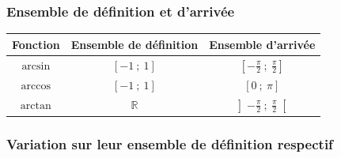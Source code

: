 \documentclass[a4paper]{article}
\begin{document}
			\vspace*{-0.25cm}

			\subsubsection*{Ensemble de définition et d'arrivée}

				\begin{center}
					\setcellgapes{1.5mm}
					\makegapedcells
					\begin{tabular}{|c|c|c|}
						\hline
						\textbf{Fonction} & \textbf{Ensemble de définition} & \textbf{Ensemble d'arrivée} \\
						\hline
						$\arcsin$ & $[-1~;~1]$ & $[-\frac{\pi}{2}~;~\frac{\pi}{2}]$ \\
						\hline
						$\arccos$ & $[-1~;~1]$ & $[0~;~\pi]$\\
						\hline
						$\arctan$ & $\mathbb{R}$ & $\left]-\frac{\pi}{2}~;~\frac{\pi}{2}\right[$\\
						\hline
					\end{tabular}
				\end{center}
			
			\vspace*{-0.25cm}

			\subsubsection*{Variation sur leur ensemble de définition respectif}

				\begin{center}

					\vspace{0.2cm}
					
				\end{center}
			
			\vspace*{-0.75cm}
\end{document}

